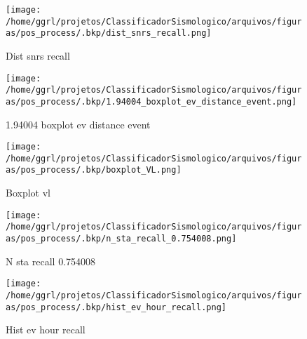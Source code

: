                     \begin{figure}[H]
                        \centering
                        \texttt{[image: /home/ggrl/projetos/ClassificadorSismologico/arquivos/figuras/pos\_process/.bkp/dist\_snrs\_recall.png]}
                        \caption{Dist snrs recall}
                        \label{fig:dist_snrs_recall}
                    \end{figure}
                

                    \begin{figure}[H]
                        \centering
                        \texttt{[image: /home/ggrl/projetos/ClassificadorSismologico/arquivos/figuras/pos\_process/.bkp/1.94004\_boxplot\_ev\_distance\_event.png]}
                        \caption{1.94004 boxplot ev distance event}
                        \label{fig:1.94004_boxplot_ev_distance_event}
                    \end{figure}
                

                    \begin{figure}[H]
                        \centering
                        \texttt{[image: /home/ggrl/projetos/ClassificadorSismologico/arquivos/figuras/pos\_process/.bkp/boxplot\_VL.png]}
                        \caption{Boxplot vl}
                        \label{fig:boxplot_VL}
                    \end{figure}
                

                    \begin{figure}[H]
                        \centering
                        \texttt{[image: /home/ggrl/projetos/ClassificadorSismologico/arquivos/figuras/pos\_process/.bkp/n\_sta\_recall\_0.754008.png]}
                        \caption{N sta recall 0.754008}
                        \label{fig:n_sta_recall_0.754008}
                    \end{figure}
                

                    \begin{figure}[H]
                        \centering
                        \texttt{[image: /home/ggrl/projetos/ClassificadorSismologico/arquivos/figuras/pos\_process/.bkp/hist\_ev\_hour\_recall.png]}
                        \caption{Hist ev hour recall}
                        \label{fig:hist_ev_hour_recall}
                    \end{figure}
                

